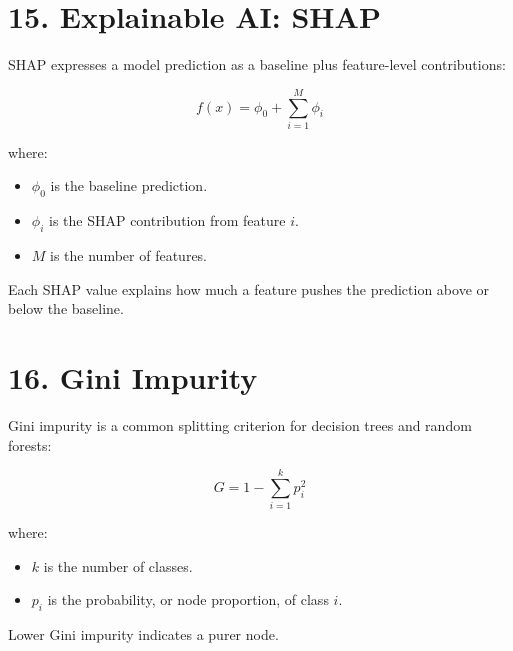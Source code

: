 \documentclass[11pt]{article}
\begin{document}
\section*{15. Explainable AI: SHAP}

SHAP expresses a model prediction as a baseline plus feature-level contributions:

\[
f(x) =
\phi_0 +
\sum_{i=1}^{M}
\phi_i
\]

\noindent where:

\begin{itemize}
    \item \(\phi_0\) is the baseline prediction.
    \item \(\phi_i\) is the SHAP contribution from feature \(i\).
    \item \(M\) is the number of features.
\end{itemize}

\noindent Each SHAP value explains how much a feature pushes the prediction above
or below the baseline.

\section*{16. Gini Impurity}

Gini impurity is a common splitting criterion for decision trees and random
forests:

\[
G =
1 - \sum_{i=1}^{k} p_i^2
\]

\noindent where:

\begin{itemize}
    \item \(k\) is the number of classes.
    \item \(p_i\) is the probability, or node proportion, of class \(i\).
\end{itemize}

\noindent Lower Gini impurity indicates a purer node.
\end{document}
